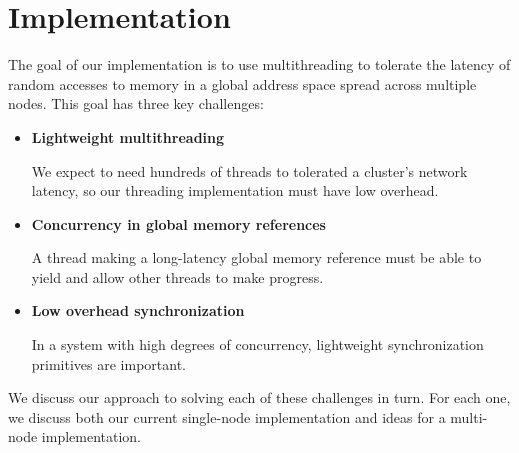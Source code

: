 \documentclass[10pt,nocopyrightspace,preprint]{sigplanconf}
\begin{document}
\begin {comment}
\todo{ discussion of coroutines \& synchronization } Were a coroutine to
block on a synchronization variable shared with other threads, the
entire fray would suspend execution.  This can lead to deadlock when,
for example, one coroutine waits to consume from another thread that
is waiting to consume what only another coroutine in this first fray
can produce.  Instead, coroutines must yield on failed synchronization
events, spinning rather than blocking, where were they bona fide
threads, blocking might be more efficient.

\todo{ say something about ``synchronization'' within a fray }

Coroutines completing their work yield without adding themselves to
the scheduling queue.  The last coroutine to exit in this way returns
as the main thread, as in the common  fork-join model of parallelism.

\end{comment}

\section{Implementation}
\label{sec:approach}


The goal of our implementation is to use multithreading to tolerate
the latency of random accesses to memory in a global address space
spread across multiple nodes. This goal has three key challenges:
\begin{itemize}
\item {\bf Lightweight multithreading}
  
  We expect to need hundreds of
  threads to tolerated a cluster's network latency, so our threading
  implementation must have low overhead.

\item {\bf Concurrency in global memory references}

  A thread making a long-latency global memory reference must be able
  to yield and allow other threads to make progress.

\item {\bf Low overhead synchronization}

  In a system with high degrees of concurrency, lightweight
  synchronization primitives are important.
\end{itemize}
We discuss our approach to solving each of these challenges in
turn. For each one, we discuss both our current single-node
implementation and ideas for a multi-node implementation.
\end{document}
